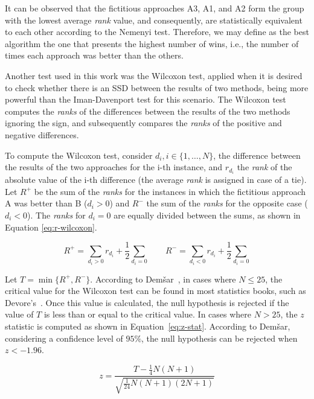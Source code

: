 It can be observed that the fictitious approaches A3, A1, and A2 form the group with the lowest average \textit{rank} value, and consequently, are statistically equivalent to each other according to the Nemenyi test. Therefore, we may define as the best algorithm the one that presents the highest number of wins, i.e., the number of times each approach was better than the others.

Another test used in this work was the Wilcoxon test, applied when it is desired to check whether there is an SSD between the results of two methods, being more powerful than the Iman-Davenport test for this scenario. The Wilcoxon test computes the \textit{ranks} of the differences between the results of the two methods ignoring the sign, and subsequently compares the \textit{ranks} of the positive and negative differences.

To compute the Wilcoxon test, consider $d_i, i \in \{1, \dots, N\}$, the difference between the results of the two approaches for the i-th instance, and $r_{d_i}$ the \textit{rank} of the absolute value of the i-th difference (the average \textit{rank} is assigned in case of a tie). Let $R^+$ be the sum of the \textit{ranks} for the instances in which the fictitious approach A was better than B ($d_i > 0$) and $R^{-}$ the sum of the \textit{ranks} for the opposite case ($d_i < 0$). The \textit{ranks} for $d_i = 0$ are equally divided between the sums, as shown in Equation \eqref{eq:r-wilcoxon}.

\begin{equation}
    R^{+} = \sum_{d_i > 0} r_{d_i} + \frac{1}{2}\sum_{d_i = 0} \quad \quad R^{-} = \sum_{d_i < 0} r_{d_i} + \frac{1}{2}\sum_{d_i = 0} \label{eq:r-wilcoxon}
\end{equation}

Let $T = \min\{R^+, R^{-}\}$. According to Dem\v{s}ar~\cite{demsar:2006}, in cases where $N \leq 25$, the critical value for the Wilcoxon test can be found in most statistics books, such as Devore’s~\cite{devore:2011}. Once this value is calculated, the null hypothesis is rejected if the value of $T$ is less than or equal to the critical value. In cases where $N > 25$, the $z$ statistic is computed as shown in Equation~\eqref{eq:z-stat}. According to Dem\v{s}ar, considering a confidence level of $95\%$, the null hypothesis can be rejected when $z < -1.96$.

\begin{equation}
    z = \frac{T - \frac{1}{4} N(N + 1)}{\sqrt{\frac{1}{24} N(N+1)(2N + 1)}} \label{eq:z-stat}
\end{equation}
